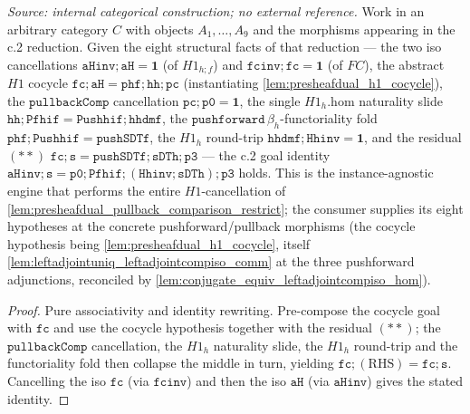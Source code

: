\begin{lemma}\leanok
  \label{lem:c2_assemble}
  \textit{Source: internal categorical construction; no external reference.}
  Work in an arbitrary category \(C\) with objects \(A_1, \dots, A_9\) and the morphisms appearing in
  the c.2 reduction. Given the eight structural facts of that reduction --- the two iso cancellations
  \(\mathtt{aHinv} \mathbin{;} \mathtt{aH} = \mathbf{1}\) (of \(H1_{h \mathbin{;} f}\)) and
  \(\mathtt{fcinv} \mathbin{;} \mathtt{fc} = \mathbf{1}\) (of \(FC\)), the abstract \(H1\) cocycle
  \(\mathtt{fc} \mathbin{;} \mathtt{aH} = \mathtt{phf} \mathbin{;} \mathtt{hh} \mathbin{;} \mathtt{pc}\)
  (instantiating \cref{lem:presheafdual_h1_cocycle}), the \(\mathtt{pullbackComp}\) cancellation
  \(\mathtt{pc} \mathbin{;} \mathtt{p0} = \mathbf{1}\), the single \(H1_h.\mathrm{hom}\) naturality
  slide \(\mathtt{hh} \mathbin{;} \mathtt{Pfhif} = \mathtt{Pushhif} \mathbin{;} \mathtt{hhdmf}\), the
  \(\mathtt{pushforward}\,\beta_h\)-functoriality fold
  \(\mathtt{phf} \mathbin{;} \mathtt{Pushhif} = \mathtt{pushSDTf}\), the \(H1_h\) round-trip
  \(\mathtt{hhdmf} \mathbin{;} \mathtt{Hhinv} = \mathbf{1}\), and the residual \((**)\)
  \(\mathtt{fc} \mathbin{;} \mathtt{s} = \mathtt{pushSDTf} \mathbin{;} \mathtt{sDTh} \mathbin{;} \mathtt{p3}\)
  --- the c.2 goal identity
  \(\mathtt{aHinv} \mathbin{;} \mathtt{s}
    = \mathtt{p0} \mathbin{;} \mathtt{Pfhif} \mathbin{;} (\mathtt{Hhinv} \mathbin{;} \mathtt{sDTh}) \mathbin{;} \mathtt{p3}\)
  holds. This is the instance-agnostic engine that performs the entire \(H1\)-cancellation of
  \cref{lem:presheafdual_pullback_comparison_restrict}; the consumer supplies its eight hypotheses at
  the concrete pushforward/pullback morphisms (the cocycle hypothesis being
  \cref{lem:presheafdual_h1_cocycle}, itself \cref{lem:leftadjointuniq_leftadjointcompiso_comm} at the
  three pushforward adjunctions, reconciled by \cref{lem:conjugate_equiv_leftadjointcompiso_hom}).
\end{lemma}
\begin{proof}
  \leanok
  Pure associativity and identity rewriting. Pre-compose the cocycle goal with \(\mathtt{fc}\) and use
  the cocycle hypothesis together with the residual \((**)\); the \(\mathtt{pullbackComp}\)
  cancellation, the \(H1_h\) naturality slide, the \(H1_h\) round-trip and the functoriality fold then
  collapse the middle in turn, yielding \(\mathtt{fc} \mathbin{;} (\text{RHS}) = \mathtt{fc} \mathbin{;} \mathtt{s}\).
  Cancelling the iso \(\mathtt{fc}\) (via \(\mathtt{fcinv}\)) and then the iso \(\mathtt{aH}\) (via
  \(\mathtt{aHinv}\)) gives the stated identity.
\end{proof}

